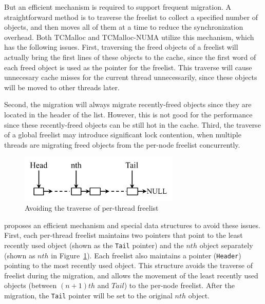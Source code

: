 But an efficient mechanism is required to support frequent migration. A straightforward method is to traverse the freelist to collect a specified number of objects, and then moves all of them at a time to reduce the synchronization overhead. Both TCMalloc and TCMalloc-NUMA utilize this mechanism, which has the following issues. First, traversing the freed objects of a freelist will actually bring the first lines of these objects to the cache, since the first word of each freed object is used as the pointer for the freelist. This traverse will cause unnecesary cache misses for the current thread unnecessarily, since these objects will be moved to other threads later. 

Second, the migration will always migrate recently-freed objects since they are located in the header of the list. However, this is not good for the performance since these recently-freed objects can be still hot in the cache. 
Third, the traverse of a global freelist may introduce significant lock contention, when multiple threads are migrating freed objects from the per-node freelist concurrently.
 

\begin{figure}[!h]
\centering
\includegraphics[width=3in]{figure/perthreadlist}
\caption{Avoiding the traverse of per-thread freelist\label{fig:perthreadlist}}
\end{figure}

\NM{} proposes an efficient mechanism and special data structures to avoid these issues. First, each per-thread freelist maintains two pointers that point to the least recently used object (shown as the \texttt{Tail} pointer) and the $nth$ object separately (shown as $nth$ in Figure~\ref{fig:perthreadlist}). Each freelist also maintains a pointer (\texttt{Header}) pointing to the most recently used object. This structure avoids the traverse of freelist during the migration, and allows the movement of the least recently used objects (between $(n+1)th$ and $Tail$) to the per-node freelist. After the migration, the \texttt{Tail} pointer will be set to the original $nth$ object. 

